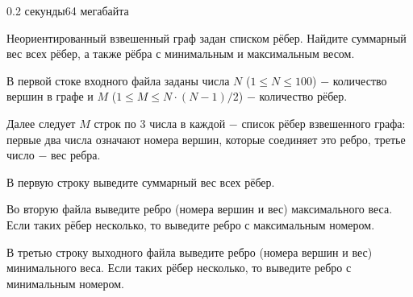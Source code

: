 \begin{problem}{}{}{}{0.2 секунды}{64 мегабайта}

Неориентированный взвешенный граф задан списком рёбер. Найдите суммарный вес всех рёбер, а также рёбра с
минимальным и максимальным весом.

\InputFile
В первой стоке входного файла заданы числа $N$ ($1 \le N \le 100$) $-$ количество вершин в графе и 
$M$ ($1 \le M \le N\cdot(N-1)/2$) $-$ количество рёбер.

Далее следует $M$ строк по $3$ числа в каждой $-$ список рёбер взвешенного графа: первые два числа означают 
номера вершин, которые соединяет это ребро, третье число $-$ вес ребра.
 
\OutputFile
В первую строку выведите суммарный вес всех рёбер.

Во вторую файла выведите ребро (номера вершин и вес) максимального веса. 
Если таких рёбер несколько, то выведите ребро с максимальным номером.

В третью строку выходного файла выведите ребро (номера вершин и вес)  минимального веса. 
Если таких рёбер несколько, то выведите ребро с минимальным номером.

\Example

\begin{example}
%
\end{example}

\end{problem}

